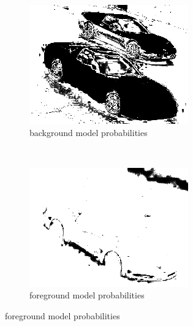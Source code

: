 \documentclass[a4paper]{article}
\begin{document}
\begin{figure}[ht]
	\vspace{2mm}
	\begin{subfigure}[h]{0.48\textwidth}
	\centering
	\includegraphics[width=\textwidth]{imgs/backgroundProb_cars.png}
	\caption*{background model probabilities}
	\end{subfigure}
	~
	\begin{subfigure}[h]{0.48\textwidth}
	\centering
	\includegraphics[width=\textwidth]{imgs/foregroundProb_cars.png}
	\caption*{foreground model probabilities}
	\end{subfigure}
		


\end{figure}
\end{document}
